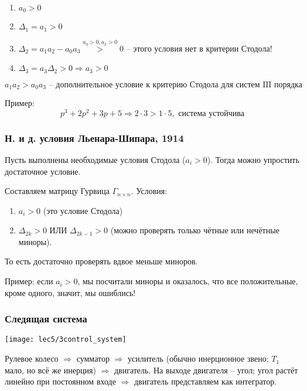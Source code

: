 \documentclass[main.tex]{subfiles}
\begin{document}
\begin{enumerate}[noitemsep]
	\item $ a_0 > 0 $
	\item $ \Delta_1 = a_1 > 0 $
	\item $ \Delta_2 = a_1 a_2 - a_0 a_3 \overset{a_0 > 0, a_3 > 0} > 0 $ -- этого условия нет в критерии Стодола!
	\item $ \Delta_3 = a_3 \Delta_2 > 0 \Rightarrow a_3 > 0 $
\end{enumerate}

$$ \boxed{a_1 a_2 > a_0 a_3} \text{ -- дополнительное условие к критерию Стодола для систем III порядка} $$

Пример:
$$ p^3 + 2 p^2 + 3p + 5 \Rightarrow 2 \cdot 3 > 1 \cdot 5, \text{ система устойчива} $$

\subsubsection{Н. и д. условия Льенара-Шипара, 1914}

Пусть выполнены необходимые условия Стодола ($ a_i > 0 $).
Тогда можно упростить достаточное условие.

Составляем матрицу Гурвица $ \Gamma_{n \times n}  $.
Условия:

\begin{enumerate}[noitemsep]
	\item $ a_i > 0 $ (это условие Стодола)
	\item $ \Delta_{2k} > 0 $ ИЛИ $ \Delta_{2k-1} > 0 $ (можно проверять только чётные или нечётные миноры).
\end{enumerate}

То есть достаточно проверять вдвое меньше миноров.

Пример: если $ a_i > 0 $, мы посчитали миноры и оказалось, что все положительные, кроме одного, значит, мы ошиблись!

\subsubsection{Следящая система}

\texttt{[image: lec5/3control\_system]}

Рулевое колесо $ \Rightarrow $ сумматор $ \Rightarrow $ усилитель (обычно инерционное звено; $T_1$ мало, но всё же инерция) $ \Rightarrow $ двигатель.
На выходе двигателя -- угол; угол растёт линейно при постоянном входе $ \Rightarrow $ двигатель представляем как интегратор.
\end{document}
